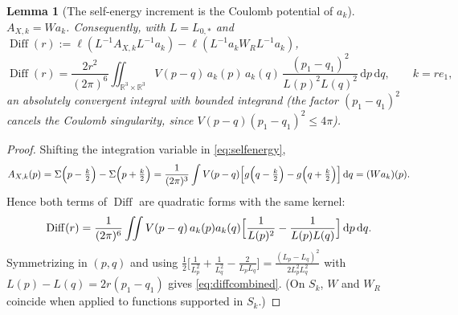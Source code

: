 \documentclass[10pt,a4paper]{amsart}
\newtheorem{lemma}{Lemma}
\newcommand{\R}{\mathbb{R}}
\newcommand{\dd}{\,\mathrm{d}}
\newcommand{\ellf}{\ell}
\begin{document}
\begin{lemma}[The self-energy increment is the Coulomb potential of $a_k$]\label{lem:AXident}
$A_{X,k}=W a_k$. Consequently, with $L=L_{0,*}$ and $\operatorname{Diff}(r):=\ellf(L^{-1}A_{X,k}L^{-1}a_k)-\ellf(L^{-1}a_kW_RL^{-1}a_k)$,
\begin{equation}\label{eq:diffcombined}
\operatorname{Diff}(r)=\frac{2r^2}{(2\pi)^6}\iint_{\R^3\times\R^3}
V(p-q)\,a_k(p)\,a_k(q)\,\frac{(p_1-q_1)^2}{L(p)^2L(q)^2}\dd p\dd q ,
\qquad k=re_1 ,
\end{equation}
an absolutely convergent integral with bounded integrand \textup{(}the factor $(p_1-q_1)^2$ cancels the Coulomb singularity, since $V(p-q)(p_1-q_1)^2\le4\pi$\textup{)}.
\end{lemma}

\begin{proof}
Shifting the integration variable in \eqref{eq:selfenergy},
\[
A_{X,k}(p)=\Sigma\Bigl(p-\tfrac k2\Bigr)-\Sigma\Bigl(p+\tfrac k2\Bigr)
=\frac{1}{(2\pi)^3}\int V(p-q)\Bigl[g\Bigl(q-\tfrac k2\Bigr)-g\Bigl(q+\tfrac k2\Bigr)\Bigr]\dd q=(Wa_k)(p).
\]
Hence both terms of $\operatorname{Diff}$ are quadratic forms with the same kernel:
\[
\operatorname{Diff}(r)=\frac{1}{(2\pi)^6}\iint V(p-q)\,a_k(p)a_k(q)\Bigl[\frac1{L(p)^2}-\frac1{L(p)L(q)}\Bigr]\dd p\dd q .
\]
Symmetrizing in $(p,q)$ and using $\frac12\bigl[\frac1{L_p^2}+\frac1{L_q^2}-\frac2{L_pL_q}\bigr]=\frac{(L_p-L_q)^2}{2L_p^2L_q^2}$ with $L(p)-L(q)=2r(p_1-q_1)$ gives \eqref{eq:diffcombined}. (On $S_k$, $W$ and $W_R$ coincide when applied to functions supported in $S_k$.)
\end{proof}
\end{document}
